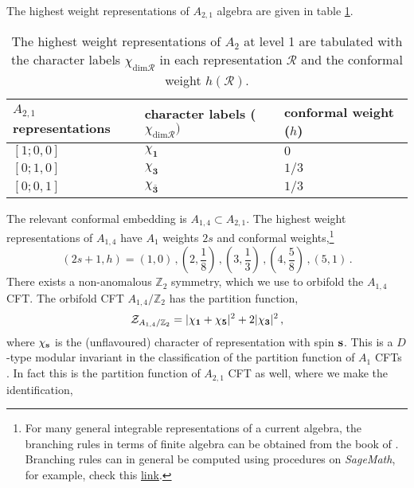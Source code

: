 \documentclass[a4paper,12pt]{article}
\begin{document}
The highest weight representations of $A_{2,1}$ algebra are given in table \ref{table: A_2_1_reps}.
%
\begin{table}
\centering
\begin{tabularx}{0.8\textwidth} { 
  | >{\centering\arraybackslash}X 
  | >{\centering\arraybackslash}X 
  | >{\centering\arraybackslash}X | }
 \hline
 $A_{2,1}$ representations & character labels ($\chi_{\mathrm{dim}\mathcal{R}})$ & conformal weight ($h$) \\
\hline
$[1;0,0]$  & $\chi_\mathbf{1}$  & $0$ \\
\hline
$[0;1,0]$  & $\chi_\mathbf{3}$  & $1/3$ \\
\hline
$[0;0,1]$  & $\chi_\mathbf{\bar 3}$  & $1/3$ \\
\hline
\end{tabularx}
\caption{The highest weight representations of $A_2$ at level 1 are tabulated with the character labels $\chi_{\mathrm{dim}\mathcal{R}}$ in each representation $\mathcal{R}$ and the conformal weight $h(\mathcal{R})$.}
\label{table: A_2_1_reps}
\end{table}
%
The relevant conformal embedding is $A_{1,4}\subset A_{2,1}$. The highest weight representations of $A_{1,4}$ have $A_1$ weights $2s$ and conformal weights,\footnote{For many general integrable representations of a current algebra, the branching rules in terms of finite algebra can be obtained from the book of \cite{kass1990affine}. Branching rules can in general be computed using procedures on \textit{SageMath}, for example, check this \href{https://doc.sagemath.org/html/en/reference/combinat/sage/combinat/root_system/branching_rules.html}{link}. }
%
\begin{equation}
    (2s+1,h)=\left(1,0\right)\, , \left(2,\frac{1}{8}\right)\, ,\left(3,\frac{1}{3}\right)\, ,\left(4,\frac{5}{8}\right)\, ,\left(5,1\right)\, .
\end{equation}
%
There exists a non-anomalous $\mathbb{Z}_2$ symmetry, which we use to orbifold the $A_{1,4}$ CFT. The orbifold CFT $A_{1,4}/\mathbb{Z}_2$ has the partition function,
\begin{equation}
    \mathcal{Z}_{A_{1,4}/\mathbb{Z}_2}=|\chi_{\bf 1}+\chi_{\bf 5}|^2+2|\chi_{\bf 3}|^2\, ,
\end{equation}
where $\chi_{\bf s}$ is the (unflavoured) character of representation with spin $\bf s$. This is a $D$-type modular invariant in the classification of the partition function of $A_1$ CFTs \cite{Cappelli:1987xt}. In fact this is the partition function of $A_{2,1}$ CFT as well, where we make the identification,
\end{document}
